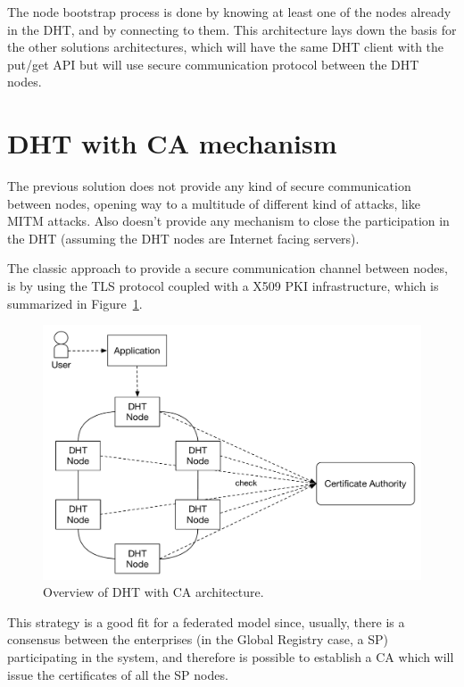 The node bootstrap process is done by knowing at least one of the nodes already in the DHT, and by connecting to them.
This architecture lays down the basis for the other solutions architectures, which will have the same DHT client with the put/get API but will use secure communication protocol between the DHT nodes.

\section{DHT with \ac{CA} mechanism}\label{architecture:ca-overview}

The previous solution does not provide any kind of secure communication between nodes, opening way to a multitude of different kind of attacks, like \ac{MITM} attacks.
Also doesn't provide any mechanism to close the participation in the \ac{DHT} (assuming the DHT nodes are Internet facing servers).

The classic approach to provide a secure communication channel between nodes, is by using the \ac{TLS} protocol coupled with a X509 PKI infrastructure, which is summarized in Figure~\ref{fig:architecture-ca-overview}.

\begin{figure}[htb]
  \centering
  \includegraphics[scale=0.5]{Figures/architecture-overview-ca.pdf}
  \caption{Overview of DHT with CA architecture.}
\label{fig:architecture-ca-overview}
\end{figure}

This strategy is a good fit for a federated model since, usually, there is a consensus between the enterprises (in the Global Registry case, a \acl{SP}) participating in the system, and therefore is possible to establish a \ac{CA} which will issue the certificates of all the \ac{SP} nodes.

